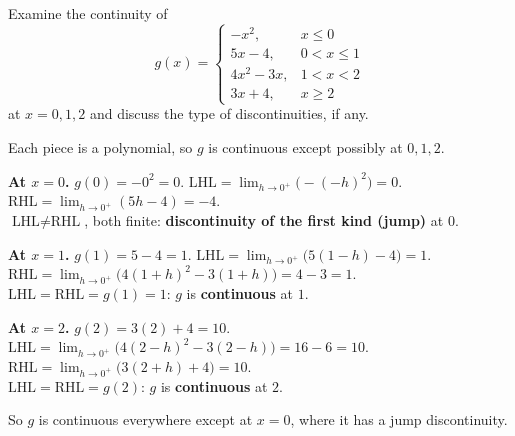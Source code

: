 \begin{example}[DU 1264 Q1(a)(ii)]
Examine the continuity of
\[
g(x)=\begin{cases}-x^2,&x\le0\\ 5x-4,&0<x\le1\\ 4x^2-3x,&1<x<2\\ 3x+4,&x\ge2\end{cases}
\]
at $x=0,1,2$ and discuss the type of discontinuities, if any.
\end{example}
\begin{solution}
Each piece is a polynomial, so $g$ is continuous except possibly at $0,1,2$.

\textbf{At $x=0$.} $g(0)=-0^2=0$. $\text{LHL}=\lim_{h\to0^+}\bigl(-(-h)^2\bigr)=0$. $\text{RHL}=\lim_{h\to0^+}(5h-4)=-4$.\\
$\text{LHL}\ne\text{RHL}$, both finite: \textbf{discontinuity of the first kind (jump)} at $0$.

\textbf{At $x=1$.} $g(1)=5-4=1$. $\text{LHL}=\lim_{h\to0^+}\bigl(5(1-h)-4\bigr)=1$. $\text{RHL}=\lim_{h\to0^+}\bigl(4(1+h)^2-3(1+h)\bigr)=4-3=1$.\\
$\text{LHL}=\text{RHL}=g(1)=1$: $g$ is \textbf{continuous} at $1$.

\textbf{At $x=2$.} $g(2)=3(2)+4=10$. $\text{LHL}=\lim_{h\to0^+}\bigl(4(2-h)^2-3(2-h)\bigr)=16-6=10$. $\text{RHL}=\lim_{h\to0^+}\bigl(3(2+h)+4\bigr)=10$.\\
$\text{LHL}=\text{RHL}=g(2)$: $g$ is \textbf{continuous} at $2$.

So $g$ is continuous everywhere except at $x=0$, where it has a jump discontinuity.
\end{solution}

